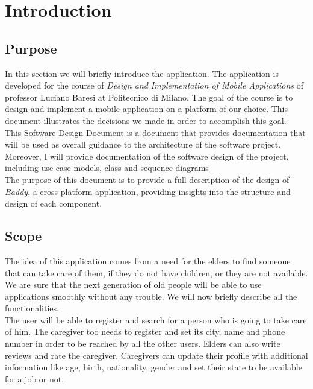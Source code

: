 \documentclass[../../dd.tex]{subfiles}
\begin{document}
    \chapter{Introduction}
    \section{Purpose}
    In this section we will briefly introduce the application.
    The application is developed for
    the course of \textit{Design and Implementation of Mobile Applications} of professor Luciano Baresi
    at Politecnico di Milano.
    The goal of the course is to design and implement a mobile application on
    a platform of our choice.
    This document illustrates the decisions we made in
    order to accomplish this goal.
    \\

    This Software Design Document is a document that provides documentation that will be used as
    overall guidance to the architecture of the software project.
    Moreover, I will provide documentation of the software design of the
    project, including use case models, class and sequence diagrams
    \\

    The purpose of this document is to provide a full description of the design of \textit{Baddy},
    a cross-platform application, providing insights into the structure and design of each component.

    \section{Scope}
    The idea of this application comes from a need for the elders to find someone that can take care of them,
    if they do not have children, or they are not available.
    We are sure that the next generation of old people will be able to use applications smoothly without any trouble.
    We will now briefly describe all the functionalities.
    \\

    The user will be able to register and search for a person who is going to take care of him.
    The caregiver too needs to register and set its city, name and phone number in order to be reached by all
    the other users.
    Elders can also write reviews and rate the caregiver.
    Caregivers can update their profile with additional information like age, birth, nationality, gender and set their
    state to be available for a job or not.
\end{document}
